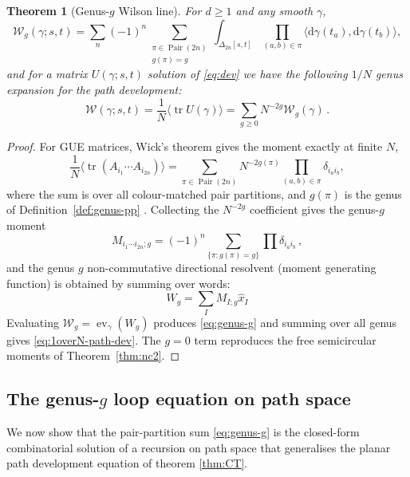 \documentclass[11pt,a4paper]{article}
\newtheorem{theorem}{Theorem}[section]
\DeclareMathOperator{\tr}{tr}
\DeclareMathOperator{\ev}{ev}
\DeclareMathOperator{\Pair}{Pair}
\newcommand{\xh}{\hat{x}}
\newcommand{\cW}{\mathcal{W}}
\newcommand{\dd}{\mathrm{d}}
\begin{document}
\begin{theorem}[Genus-$g$ Wilson line]\label{thm:genus-g}
For $d\geq1$ and any smooth $\gamma$,
\begin{equation}\label{eq:genus-g}
  \cW_g(\gamma;s,t) = \sum_{n}(-1)^n \sum_{\substack{\pi\in\Pair(2n)\\g(\pi)=g}} \int_{\Delta_{2n}[s,t]} \prod_{(a,b)\in\pi}\langle\dd\gamma(t_a),\dd\gamma(t_b)\rangle,
\end{equation}
and for a matrix $U(\gamma;s,t)$ solution of \eqref{eq:dev} we have the following $1/N$ genus expansion for the path development:
%
\begin{equation}\label{eq:1overN-path-dev}
\cW(\gamma;s,t)=\frac{1}{N}\langle\tr U(\gamma)\rangle = \sum_{g\geq0}N^{-2g}\cW_g(\gamma)\,.
\end{equation}
\end{theorem}


\begin{proof}
For GUE matrices, Wick's theorem gives the moment exactly at finite $N$,
\begin{equation}
  \frac{1}{N}\bigl\langle\tr(A_{i_1}\cdots A_{i_{2n}})\bigr\rangle
  = \sum_{\pi\in\Pair(2n)} N^{-2g(\pi)}\prod_{(a,b)\in\pi}\delta_{i_a i_b},
\end{equation}
where the sum is over all colour-matched pair partitions, and $g(\pi)$ is the genus of Definition~\ref{def:genus-pp} \cite{t1993planar,eynard2016counting}. Collecting the $N^{-2g}$ coefficient gives the genus-$g$ moment 
%
\begin{equation}
M_{i_1\cdots i_{2n};g}=(-1)^n\sum_{\{\pi:g(\pi)=g\}}\prod\delta_{i_a i_b}\,,
\end{equation}
%
and the genus $g$ non-commutative directional resolvent (moment generating function) is obtained by summing over words:
%
\begin{equation}
    W_g=\sum_{I} M_{I;g}\xh_I
\end{equation}
%
Evaluating $\cW_g=\ev_\gamma(W_g)$ produces \eqref{eq:genus-g} and summing over all genus gives \eqref{eq:1overN-path-dev}. The $g=0$ term reproduces the free semicircular moments of Theorem~\ref{thm:nc2}.
\end{proof}

\subsection{The genus-\texorpdfstring{$g$}{g} loop equation on path space}\label{sec:genus-loop}


We now show that the pair-partition sum \eqref{eq:genus-g} is the closed-form combinatorial solution of a recursion on path space that generalises the planar path development equation of theorem \ref{thm:CT}.
\end{document}
